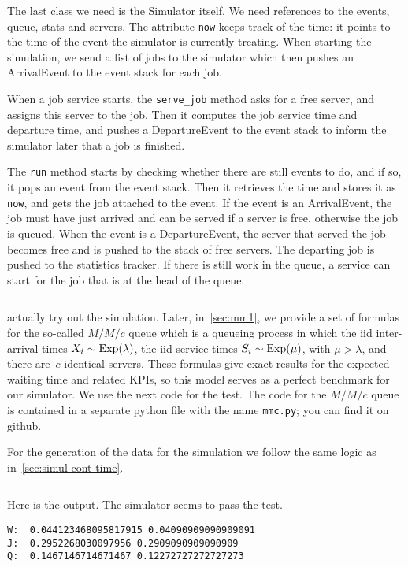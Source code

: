 \documentclass[stochastic-or.tex]{subfiles}
\begin{document}
The last class we need is the Simulator itself.
We need references to the events, queue, stats and servers.
The attribute \texttt{now} keeps track of the time: it points to the time of the event the simulator is currently treating.
When starting the simulation, we send a list of jobs to the simulator which then pushes an ArrivalEvent  to the event stack for each job.

When a job service starts, the \texttt{serve_job} method asks for a free server, and assigns this server to the job.
Then it computes the job service time and departure time, and pushes a DepartureEvent to the event stack to inform the simulator later that a job is finished.

The \texttt{run} method starts by checking whether there are still events to do, and if so, it pops an event from the event stack.
Then it retrieves the time and stores it as \texttt{now}, and gets the job attached to the event.
If the event is an ArrivalEvent, the job must have just arrived and can be served if a server is free, otherwise the job is queued.
When the event is a DepartureEvent, the server that served the job becomes free and is pushed to the stack of free servers.
The departing job is pushed to the statistics tracker.
If there is still work in the queue, a service can start for the job that is at the head of the queue.

\inputminted[label=simulator.py]{python}{../code/event_stacks/simulator.py}

 actually try out the simulation.
Later, in~\cref{sec:mm1}, we provide a set of formulas for the so-called $M/M/c$ queue which is a queueing process in which the iid inter-arrival times $X_i\sim\mathrm{Exp}(\lambda)$, the iid service times $S_{i}\sim\mathrm{Exp}(\mu)$, with $\mu > \lambda$, and there are~$c$ identical servers.
These formulas give exact results for the expected waiting time and related KPIs, so this model serves as a perfect benchmark for our simulator.
We use the next code for the test.
The code for the $M/M/c$ queue is contained in a separate python file with the name \texttt{mmc.py}; you can find it on github.

For the generation of the data for the simulation we follow the same logic as in~\cref{sec:simul-cont-time}.
\inputminted[label=test-mmc.py]{python}{../code/event_stacks/test_mmc.py}

Here is the output. The simulator seems to pass the test.
\begin{verbatim}
W:  0.044123468095817915 0.04090909090909091
J:  0.2952268030097956 0.2909090909090909
Q:  0.1467146714671467 0.12272727272727273
\end{verbatim}
\end{document}

